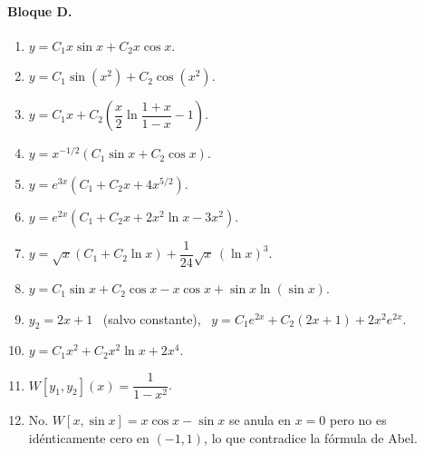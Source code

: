 {\paragraph{Bloque D.}
\begin{enumerate}[label=\textbf{D\arabic*.}, leftmargin=*]
    \item $y=C_1x\sin x+C_2x\cos x$.
    \item $y=C_1\sin\left(x^2\right)+C_2\cos\left(x^2\right)$.
    \item $y=C_1x+C_2\left(\dfrac{x}{2}\ln\dfrac{1+x}{1-x}-1\right)$.
    \item $y=x^{-1/2}\left(C_1\sin x+C_2\cos x\right)$.
    \item $y=e^{3x}\left(C_1+C_2x+4x^{5/2}\right)$.
    \item $y=e^{2x}\left(C_1+C_2x+2x^2\ln x-3x^2\right)$.
    \item $y=\sqrt{x}\left(C_1+C_2\ln x\right)+\dfrac{1}{24}\sqrt{x}\,(\ln x)^3$.
    \item $y=C_1\sin x+C_2\cos x-x\cos x+\sin x\ln(\sin x)$.
    \item $y_2=2x+1$ \ (salvo constante), \ $y=C_1e^{2x}+C_2(2x+1)+2x^2e^{2x}$.
    \item $y=C_1x^2+C_2x^2\ln x+2x^4$.
    \item $W[y_1,y_2](x)=\dfrac{1}{1-x^2}$.
    \item No. $W[x,\sin x]=x\cos x-\sin x$ se anula en $x=0$ pero no es id\'enticamente cero en $(-1,1)$, lo que contradice la f\'ormula de Abel.
\end{enumerate}

}
